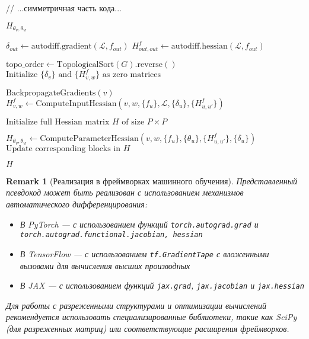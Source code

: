 \documentclass[11pt]{article}
\newtheorem{remark}{Remark}
\begin{document}
\begin{algorithm}
\begin{algorithmic}[1]
    // ...симметричная часть кода...
    \EndFor

    \State \Return $H_{\theta_v, \theta_w}$
    \EndFunction

    \State $\delta_{out} \gets \text{autodiff.gradient}(\mathcal{L}, f_{out})$
    \State $H^f_{out,out} \gets \text{autodiff.hessian}(\mathcal{L}, f_{out})$

    \State $\text{topo\_order} \gets \text{TopologicalSort}(G).\text{reverse}()$
    \State $\text{Initialize } \{\delta_v\} \text{ and } \{H^f_{v,w}\} \text{ as zero matrices}$

    \State $\text{BackpropagateGradients}(v)$  
    \State $H^f_{v,w} \gets \text{ComputeInputHessian}(v, w, \{f_u\}, \mathcal{L}, \{\delta_u\}, \{H^f_{u,u'}\})$
    \EndFor
    \EndFor

    \State $\text{Initialize full Hessian matrix } H \text{ of size } P \times P$

    \State $H_{\theta_v, \theta_w} \gets \text{ComputeParameterHessian}(v, w, \{f_u\}, \{\theta_u\},
    \{H^f_{u,u'}\}, \{\delta_u\})$
    \State $\text{Update corresponding blocks in } H$
    \EndIf
    \EndFor

    \State \Return $H$
    \EndFunction
  \end{algorithmic}
\end{algorithm}

\begin{remark}[Реализация в фреймворках машинного обучения]
  Представленный псевдокод может быть реализован с использованием механизмов автоматического дифференцирования:
  \begin{itemize}
    \item В PyTorch — с использованием функций \texttt{torch.autograd.grad} и
      \texttt{torch.autograd.functional.jacobian, hessian}
    \item В TensorFlow — с использованием \texttt{tf.GradientTape} с вложенными вызовами для вычисления
      высших производных
    \item В JAX — с использованием функций \texttt{jax.grad}, \texttt{jax.jacobian} и \texttt{jax.hessian}
  \end{itemize}
  Для работы с разреженными структурами и оптимизации вычислений рекомендуется использовать
  специализированные библиотеки, такие как SciPy (для разреженных матриц) или соответствующие расширения фреймворков.
\end{remark}
\end{document}
